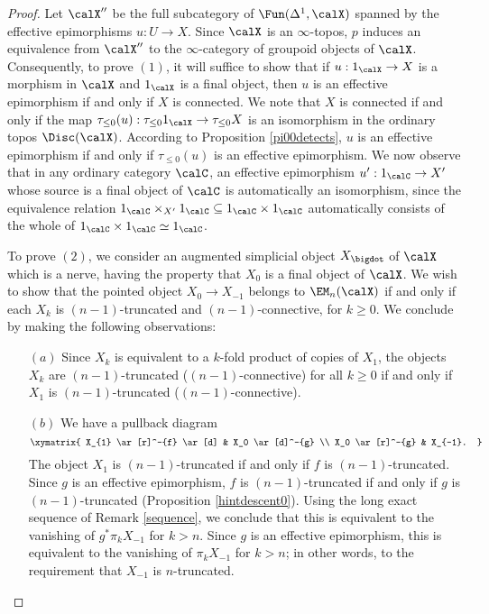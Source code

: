 \begin{proof}
Let $\calX''$ be the full subcategory of $\Fun(\Delta^1,\calX)$ spanned by the effective epimorphisms
$u: U \rightarrow X$. Since $\calX$ is an $\infty$-topos, $p$ induces an equivalence
from $\calX''$ to the $\infty$-category of groupoid objects of $\calX$. Consequently, to prove
$(1)$, it will suffice to show that if $u: 1_{\calX} \rightarrow X$ is a morphism in $\calX$ and
$1_{\calX}$ is a final object, then $u$ is an effective epimorphism if and only if $X$ is connected.
We note that $X$ is connected if and only if the map $\tau_{\leq 0}(u):
\tau_{\leq 0} 1_{\calX} \rightarrow \tau_{\leq 0} X$ is an isomorphism in the ordinary
topos $\Disc(\calX)$. According to Proposition \ref{pi00detects}, $u$
is an effective epimorphism if and only if $\tau_{\leq 0}(u)$ is an effective epimorphism.
We now observe that in any ordinary category $\calC$, an effective epimorphism
$u': 1_{\calC} \rightarrow X'$ whose source is a final object of $\calC$ is automatically an isomorphism, since the equivalence relation $1_{\calC} \times_{X'} 1_{\calC} \subseteq 1_{\calC} \times 1_{\calC}$ automatically consists of the whole of $1_{\calC} \times 1_{\calC} \simeq 1_{\calC}$.

To prove $(2)$, we consider an augmented simplicial object $X_{\bigdot}$ of $\calX$
which is a \Cech nerve, having the property that $X_0$ is a final object of $\calX$.
We wish to show that the pointed object $X_0 \rightarrow X_{-1}$ belongs to
$\EM_{n}(\calX)$ if and only if each $X_{k}$ is $(n-1)$-truncated and $(n-1)$-connective,
for $k \geq 0$. We conclude by making the following observations:
\begin{itemize}
\item[$(a)$] Since $X_{k}$ is equivalent to a $k$-fold product of copies of $X_{1}$, the
objects $X_{k}$ are $(n-1)$-truncated ($(n-1)$-connective) for all $k \geq 0$ if and only if
$X_{1}$ is $(n-1)$-truncated ($(n-1)$-connective).

\item[$(b)$] We have a pullback diagram
$$ \xymatrix{ X_{1} \ar[r]^-{f} \ar[d] & X_0 \ar[d]^-{g} \\
X_0 \ar[r]^-{g} & X_{-1}. }$$
The object $X_{1}$ is $(n-1)$-truncated if and only if $f$ is $(n-1)$-truncated.
Since $g$ is an effective epimorphism, $f$ is $(n-1)$-truncated if and only if $g$ is $(n-1)$-truncated (Proposition \ref{hintdescent0}). Using the long exact sequence of Remark \ref{sequence}, we conclude that this is equivalent to the vanishing of $g^{\ast} \pi_k X_{-1}$ for $k > n$.
Since $g$ is an effective epimorphism, this is equivalent to the vanishing of
$\pi_k X_{-1}$ for $k > n$; in other words, to the requirement that $X_{-1}$ is $n$-truncated.


\end{itemize}
\end{proof}
